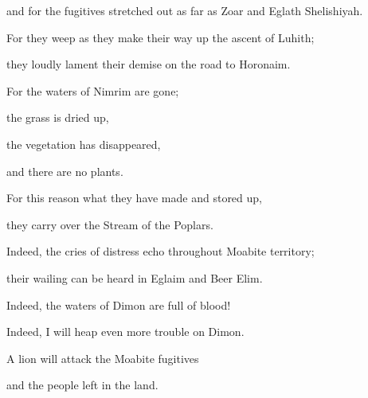 {\par }{\Q and for the fugitives
stretched out as far as
Zoar
and Eglath Shelishiyah.
\par }{\Q For
they weep
as they make their way up
the ascent
of Luhith;
\par }{\Q they loudly
lament
their demise
on the road
to Horonaim.
\par }{\Q {}For
the waters
of Nimrim
are gone;
\par }{\Q the grass
is dried
up,
\par }{\Q the vegetation
has disappeared,
\par }{\Q and there are
no
plants.
\par }{\Q {}For this reason
what they have
made
and stored up,
\par }{\Q they carry over
the Stream
of the Poplars.
\par }{\Q {}Indeed,
the cries of distress
echo throughout
Moabite
territory;
\par }{\Q their wailing
can be heard in
Eglaim
and Beer Elim.
\par }{\Q {}Indeed,
the waters
of Dimon
are full
of blood!
\par }{\Q Indeed,
I will heap even more trouble on Dimon.
\par }{\Q A lion
will
attack the Moabite
fugitives
\par }{\Q and the people left
in the land.

\par }
